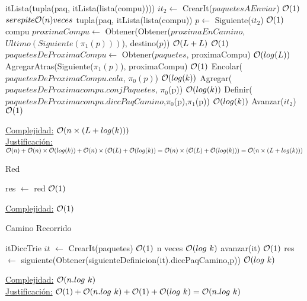 \begin{Algoritmos}
\begin{algorithm}
\begin{algorithmic}[1]
  \State itLista(tupla(paq, itLista(lista(compu)))) $it_2 \gets$ CrearIt($paquetesAEnviar$) \Comment  $\mathcal{O}(1)$
   \Comment  $se repite \mathcal{O}(n) veces$
      \State tupla(paq, itLista(lista(compu)) $p \gets$ Siguiente($it_2$) \Comment  $\mathcal{O}(1)$
      \State compu $proximaCompu \gets$ Obtener(Obtener($proximaEnCamino$, $Ultimo(Siguiente(\pi_1(p)))$), destino($p$)) 
      \State \Comment  $\mathcal{O}(L + L)$
       \Comment  $\mathcal{O}(1)$
	\State $paquetesDeProximaCompu \gets$ Obtener($paquetes$, proximaCompu) \Comment  $\mathcal{O}(log(L))$
      	\State AgregarAtras(Siguiente($\pi_1(p)$), proximaCompu) \Comment  $\mathcal{O}(1)$
      	\State Encolar($paquetesDeProximaCompu$.$cola$, $\pi_0(p)$) \Comment  $\mathcal{O}(log(k))$
      	\State Agregar($paquetesDeProximacompu$.$conjPaquetes$, $\pi_0$(p)) \Comment  $\mathcal{O}(log(k))$
	\State Definir($paquetesDeProximacompu.diccPaqCamino$,$\pi_0$(p),$\pi_1$(p)) \Comment  $\mathcal{O}(log(k))$
      \EndIf
      \State Avanzar($it_2$) \Comment  $\mathcal{O}(1)$
  \EndWhile
 
 \EndProcedure
 \end{algorithmic}
 \underline{Complejidad:} $\mathcal{O}(n \times (L + log(k)))$\\
 \underline{Justificación:} $\mathcal{O}(n)+\mathcal{O}(n) \times \mathcal{O}(log(k))+\mathcal{O}(n)\times (\mathcal{O}(L) + \mathcal{O}(log(k)) = \mathcal{O}(n) \times (\mathcal{O}(L) + \mathcal{O}(log(k)))=
 \mathcal{O}(n \times (L + log(k)))$
\end{algorithm}



\begin{algorithm}
\caption{Red}
\begin{algorithmic}[1]
 \State res $\gets$ red \Comment $\mathcal{O}(1)$
 \EndProcedure
\end{algorithmic}
   \underline{Complejidad:} $\mathcal{O}(1)$
\end{algorithm}

\begin{algorithm}
\caption{Camino Recorrido}
\begin{algorithmic}[1]
   \State itDiccTrie $it$ $\gets$ CrearIt(paquetes) \Comment $\mathcal{O}(1)$
    \Comment n veces $\mathcal{O}(log \ k)$
   \State avanzar(it) \Comment $\mathcal{O}(1)$
   \EndWhile
   \State res $\gets$ siguiente(Obtener(siguienteDefinicion(it).diccPaqCamino,p)) \Comment $\mathcal{O}(log \ k)$
  \EndProcedure
\end{algorithmic}
 \underline{Complejidad:} $\Ogr(n.log \ k)$\\
 \underline{Justificación:} $\Ogr(1)+\Ogr(n.log \ k)+\Ogr(1)+\Ogr(log \ k) = \Ogr(n.log \ k)$
\end{algorithm}



\end{Algoritmos}
